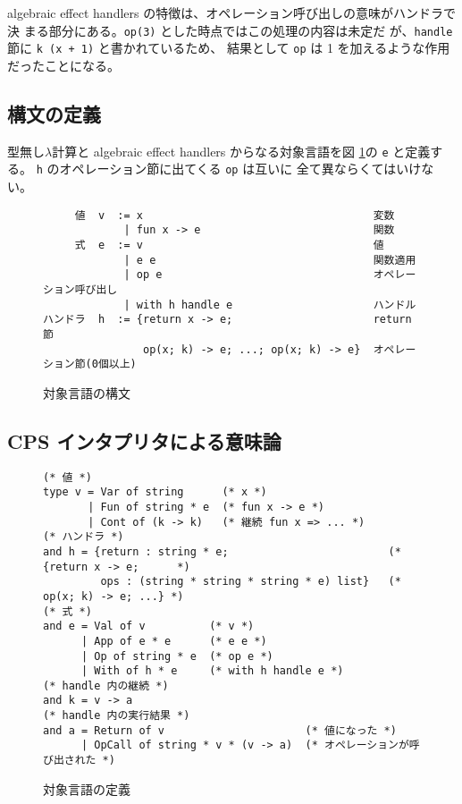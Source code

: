 algebraic effect handlers の特徴は、オペレーション呼び出しの意味がハンドラで決
まる部分にある。\texttt{op(3)} とした時点ではこの処理の内容は未定だ
が、\texttt{handle} 節に \texttt{k (x + 1)} と書かれているため、
結果として \texttt{op} は 1 を加えるような作用だったことになる。

\subsection{構文の定義}
\label{subsection:syntax}
型無し$\lambda$計算と algebraic effect handlers からなる対象言語を図 \ref{figure:abstract_syntax}の \texttt{e} と定義する。
\texttt{h} のオペレーション節に出てくる \texttt{op} は互いに
全て異ならくてはいけない。

\begin{figure}[t]
\begin{spacing}{0.9}
\begin{verbatim}
　　　値  v  := x                                    変数
　　　　      | fun x -> e                           関数
　　　式  e  := v                                    値
　　　　      | e e                                  関数適用
　　　　      | op e                                 オペレーション呼び出し
　　　　      | with h handle e                      ハンドル
ハンドラ  h  := {return x -> e;                      return 節
　　　　         op(x; k) -> e; ...; op(x; k) -> e}  オペレーション節(0個以上)
\end{verbatim}
\end{spacing}
\caption{対象言語の構文}
\label{figure:abstract_syntax}
\end{figure}

\subsection{CPS インタプリタによる意味論}
\label{subsection:1cps}

\begin{figure}[t]
\begin{spacing}{0.9}
\begin{verbatim}
(* 値 *)
type v = Var of string      (* x *)
       | Fun of string * e  (* fun x -> e *)
       | Cont of (k -> k)   (* 継続 fun x => ... *)
(* ハンドラ *)
and h = {return : string * e;                         (* {return x -> e;      *)
         ops : (string * string * string * e) list}   (*  op(x; k) -> e; ...} *)
(* 式 *)
and e = Val of v          (* v *)
      | App of e * e      (* e e *)
      | Op of string * e  (* op e *)
      | With of h * e     (* with h handle e *)
(* handle 内の継続 *)
and k = v -> a
(* handle 内の実行結果 *)
and a = Return of v                      (* 値になった *)
      | OpCall of string * v * (v -> a)  (* オペレーションが呼び出された *)
\end{verbatim}
\caption{対象言語の定義}
\label{figure:syntax}
\end{spacing}
\end{figure}

